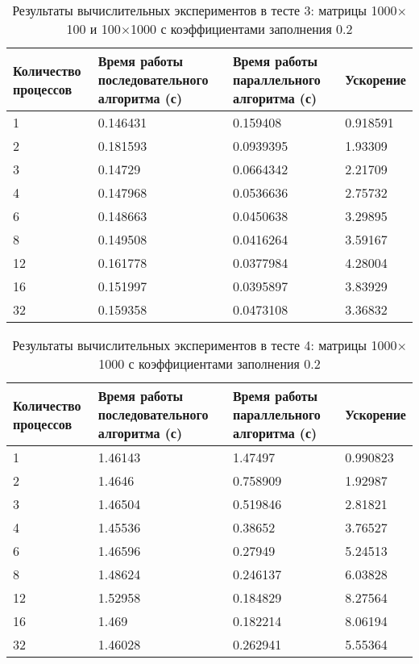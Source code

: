 \documentclass{report}
\begin{document}
\begin{table}[H]
    \caption{Результаты вычислительных экспериментов в тесте 3: матрицы 1000\(\times\)100 и 100\(\times\)1000 с коэффициентами заполнения 0.2}
    \centering
    \begin{tabular}{|m{2cm}|m{5cm}|m{5cm}|m{2cm}|}
        \toprule
        Количество процессов & Время работы последовательного алгоритма (с) & Время работы параллельного алгоритма (с) & Ускорение \\
        \midrule
        1  & 0.146431 & 0.159408  & 0.918591 \\
        2  & 0.181593 & 0.0939395 & 1.93309  \\
        3  & 0.14729  & 0.0664342 & 2.21709  \\
        4  & 0.147968 & 0.0536636 & 2.75732  \\
        6  & 0.148663 & 0.0450638 & 3.29895  \\
        8  & 0.149508 & 0.0416264 & 3.59167  \\
        12 & 0.161778 & 0.0377984 & 4.28004  \\
        16 & 0.151997 & 0.0395897 & 3.83929  \\
        32 & 0.159358 & 0.0473108 & 3.36832  \\
        \bottomrule
    \end{tabular}
\end{table}

\begin{table}[H]
    \caption{Результаты вычислительных экспериментов в тесте 4: матрицы 1000\(\times\)1000 с коэффициентами заполнения 0.2}
    \centering
    \begin{tabular}{|m{2cm}|m{5cm}|m{5cm}|m{2cm}|}
        \toprule
        Количество процессов & Время работы последовательного алгоритма (с) & Время работы параллельного алгоритма (с) & Ускорение \\
        \midrule
        1  & 1.46143 & 1.47497  & 0.990823 \\
        2  & 1.4646  & 0.758909 & 1.92987  \\
        3  & 1.46504 & 0.519846 & 2.81821  \\
        4  & 1.45536 & 0.38652  & 3.76527  \\
        6  & 1.46596 & 0.27949  & 5.24513  \\
        8  & 1.48624 & 0.246137 & 6.03828  \\
        12 & 1.52958 & 0.184829 & 8.27564  \\
        16 & 1.469   & 0.182214 & 8.06194  \\
        32 & 1.46028 & 0.262941 & 5.55364  \\
        \bottomrule
    \end{tabular}
\end{table}
\end{document}

